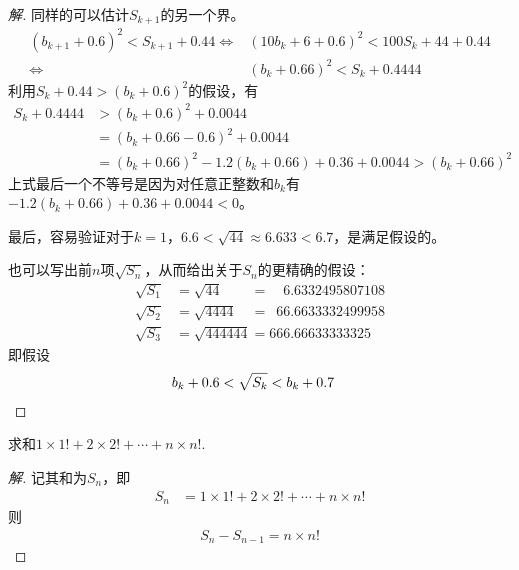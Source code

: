 \begin{proof}[解]
  同样的可以估计$S_{k+1}$的另一个界。
  \begin{align*}
    (b_{k+1}+0.6)^2 < S_{k+1} + 0.44 \iff & (10b_k + 6 + 0.6)^2 < 100S_k + 44 + 0.44\\
    \iff & (b_k + 0.66)^2 < S_k + 0.4444
  \end{align*}
  利用$S_k + 0.44 > (b_k + 0.6)^2$的假设，有
  \begin{align*}
    S_k+ 0.4444 & > (b_k + 0.6)^2 + 0.0044\\
                & = (b_k + 0.66 -0.6)^2 + 0.0044\\
                & = (b_k + 0.66)^2 -1.2(b_k+0.66) + 0.36 + 0.0044 > (b_k + 0.66)^2
  \end{align*}
  上式最后一个不等号是因为对任意正整数和$b_k$有$-1.2(b_k+0.66)+0.36+0.0044<0$。

  最后，容易验证对于$k=1$，$6.6<\sqrt{44}\approx 6.633<6.7$，是满足假设的。
  
  也可以写出前$n$项$\sqrt{S_n}$，从而给出关于$S_n$的更精确的假设：
  \begin{align*}
    \sqrt{S_1} &= \sqrt{44}\phantom{4444} = \phantom{66}6.6332495807108\\
    \sqrt{S_2} &= \sqrt{4444}\phantom{44} = \phantom{6}66.6633332499958\\
    \sqrt{S_3} &= \sqrt{444444} = 666.66633333325
  \end{align*}
  即假设
  \begin{align*}
    b_k + 0.6 < \sqrt{S_k} < b_k + 0.7 &\qedhere
  \end{align*}  
\end{proof}

\begin{example}
  求和$1\times 1!+2\times 2! + \cdots + n\times n!.$
\end{example}
\begin{proof}[解]
  记其和为$S_n$，即
  \begin{align*}
    S_n&=1\times 1!+2\times 2! + \cdots + n\times n!
  \end{align*}
  则
  \begin{align*}
    S_n - S_{n-1} = n\times n!
  \end{align*}

\end{proof}
